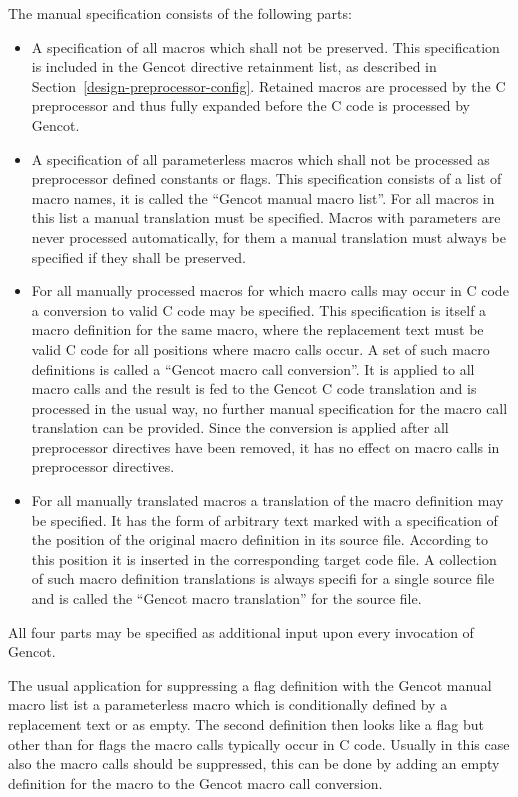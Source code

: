 The manual specification consists of the following parts:
\begin{itemize}
\item A specification of all macros which shall not be preserved. This specification is included in the 
Gencot directive retainment list, as described in 
Section~\ref{design-preprocessor-config}. Retained macros are processed by the C preprocessor and thus 
fully expanded before the C code is processed by Gencot.
\item A specification of all parameterless macros which shall not be processed as preprocessor defined
constants or flags. This specification consists of a list of macro names, it is called the ``Gencot manual macro list''.
For all macros in this list a manual translation must be specified. Macros with parameters are never 
processed automatically, for them a manual translation must always be specified if they shall be preserved.
\item For all manually processed macros for which macro calls may occur in C code a conversion to valid C 
code may be specified.
This specification is itself a macro definition for the same macro, where the replacement text must be valid
C code for all positions where macro calls occur. A set of such macro definitions is called a ``Gencot macro 
call conversion''. It is applied to all macro calls and the result is fed to 
the Gencot C code translation and is processed in the usual way, no further manual specification for the macro call
translation can be provided. Since the conversion is applied after all preprocessor directives have been
removed, it has no effect on macro calls in preprocessor directives. 
\item For all manually translated macros a translation of the macro definition may be specified. It has the form 
of arbitrary text marked with a specification of the position of the original macro definition in its source file.
According to this position it is inserted in the corresponding target code file. A collection of such macro 
definition translations is always specifi for a single source file and is called the ``Gencot macro translation''
for the source file.
\end{itemize}
All four parts may be specified as additional input upon every invocation of Gencot.

The usual application for suppressing a flag definition with the Gencot manual macro list ist a parameterless macro
which is conditionally defined by a replacement text or as empty. The second definition then looks like a flag but
other than for flags the macro calls typically occur in C code. Usually in this case also the macro calls should
be suppressed, this can be done by adding an empty definition for the macro to the Gencot macro call conversion.

